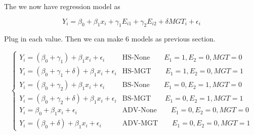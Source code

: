 \documentclass[]{book}
\newenvironment{Shaded}{\begin{snugshade}}{\end{snugshade}}
\newcommand{\CommentTok}[1]{\textcolor[rgb]{0.56,0.35,0.01}{\textit{#1}}}
\newcommand{\DataTypeTok}[1]{\textcolor[rgb]{0.13,0.29,0.53}{#1}}
\newcommand{\DecValTok}[1]{\textcolor[rgb]{0.00,0.00,0.81}{#1}}
\newcommand{\KeywordTok}[1]{\textcolor[rgb]{0.13,0.29,0.53}{\textbf{#1}}}
\newcommand{\NormalTok}[1]{#1}
\newcommand{\OperatorTok}[1]{\textcolor[rgb]{0.81,0.36,0.00}{\textbf{#1}}}
\newcommand{\StringTok}[1]{\textcolor[rgb]{0.31,0.60,0.02}{#1}}
\theoremstyle{definition}
\theoremstyle{definition}
\theoremstyle{definition}
\theoremstyle{remark}
\begin{document}
The we now have regression model as

\begin{equation}
  Y_i = \beta_0 + \beta_1 x_i + \gamma_1 E_{i1} + \gamma_2 E_{i2} + \delta MGT_i + \epsilon_i
  \label{eq:dummymod}
\end{equation}

\begin{Shaded}
\end{Shaded}

Plug in each value. Then we can make 6 models as previous section.

\begin{equation}
  \begin{cases}
    Y_i = (\beta_0 + \gamma_1) + \beta_1 x_i + \epsilon_i & \text{HS-None} \qquad E_1 = 1, E_2 = 0, MGT = 0 \\
    Y_i = (\beta_0 + \gamma_1 + \delta) + \beta_1 x_i + \epsilon_i & \text{HS-MGT} \qquad E_1 = 1, E_2 = 0, MGT = 1 \\
    Y_i = (\beta_0 + \gamma_2) + \beta_1 x_i + \epsilon_i & \text{BS-None} \qquad E_1 = 0, E_2 = 1, MGT = 0 \\
    Y_i = (\beta_0 + \gamma_2 + \delta) + \beta_1 x_i + \epsilon_i & \text{BS-MGT} \qquad E_1 = 0, E_2 = 1, MGT = 1 \\
    Y_i = \beta_0 + \beta_1 x_i + \epsilon_i & \text{ADV-None} \qquad E_1 = 0, E_2 = 0, MGT = 0 \\
    Y_i = (\beta_0 + \delta) + \beta_1 x_i + \epsilon_i & \text{ADV-MGT} \qquad E_1 = 0, E_2 = 0, MGT = 1
  \end{cases}
  \label{eq:dummysep}
\end{equation}
\end{document}
